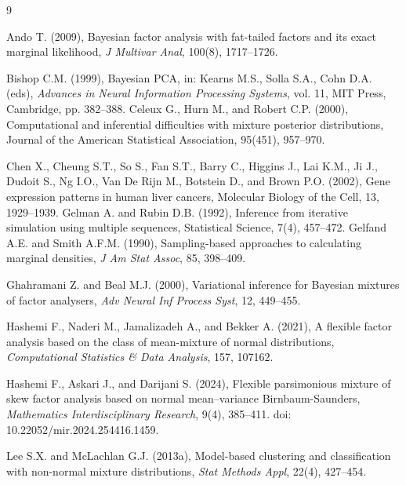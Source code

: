 \documentclass[twoside]{article}
\theoremstyle{definition}
\begin{document}
\begin{thebibliography}{9}

Ando T. (2009), Bayesian factor analysis with fat-tailed factors and its exact marginal likelihood, {\it J Multivar Anal}, 100(8), 1717–1726.

Bishop C.M. (1999), Bayesian PCA, in: Kearns M.S., Solla S.A., Cohn D.A. (eds), {\it Advances in Neural Information Processing Systems}, vol. 11, MIT Press, Cambridge, pp. 382–388.
Celeux G., Hurn M., and Robert C.P. (2000), Computational and inferential difficulties with mixture posterior distributions, Journal of the American Statistical Association, 95(451), 957--970.

Chen X., Cheung S.T., So S., Fan S.T., Barry C., Higgins J., Lai K.M., Ji J., Dudoit S., Ng I.O., Van De Rijn M., Botstein D., and Brown P.O. (2002), Gene expression patterns in human liver cancers, Molecular Biology of the Cell, 13, 1929--1939.
Gelman A. and Rubin D.B. (1992), Inference from iterative simulation using multiple sequences, Statistical Science, 7(4), 457--472.
Gelfand A.E. and Smith A.F.M. (1990), Sampling-based approaches to calculating marginal densities, {\it J Am Stat Assoc}, 85, 398–409.

Ghahramani Z. and Beal M.J. (2000), Variational inference for Bayesian mixtures of factor analysers, {\it Adv Neural Inf Process Syst}, 12, 449–455.

Hashemi F., Naderi M., Jamalizadeh A., and Bekker A. (2021), A flexible factor analysis based on the class of mean-mixture of normal distributions, {\it Computational Statistics \& Data Analysis}, 157, 107162.

Hashemi F., Askari J., and Darijani S. (2024), Flexible parsimonious mixture of skew factor analysis based on normal mean--variance Birnbaum-Saunders, {\it Mathematics Interdisciplinary Research}, 9(4), 385–411. doi: 10.22052/mir.2024.254416.1459.

Lee S.X. and McLachlan G.J. (2013a), Model-based clustering and classification with non-normal mixture distributions, {\it Stat Methods Appl}, 22(4), 427–454.


\end{thebibliography}
\end{document}
